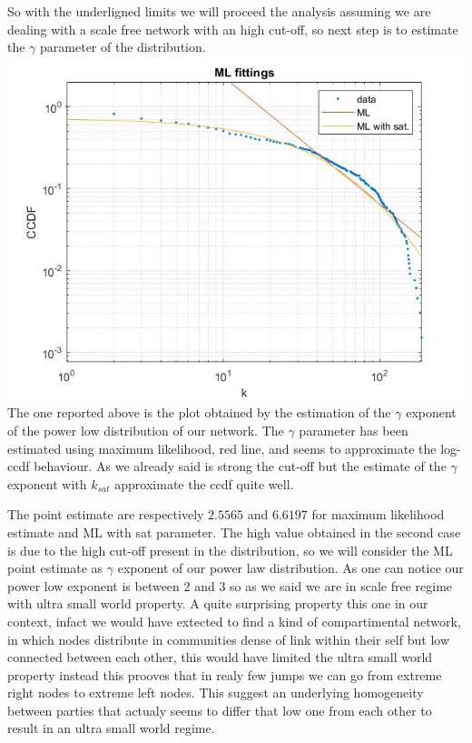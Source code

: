 \documentclass{article}%
\begin{document}
So with the underligned limits we will proceed the analysis assuming we are dealing with a scale free network with an high cut-off, so next step is to estimate the $\gamma$ parameter of the distribution.\\


\includegraphics[scale=0.5]{ML_fit}
\\

The one reported above is the plot obtained by the estimation of the $\gamma$ exponent of the power low distribution of our network. The $\gamma$ parameter has been estimated using maximum likelihood, red line, and seems to approximate the log-ccdf behaviour. As we already said is strong the cut-off but the estimate of the $\gamma$ exponent with $k_{sat}$ approximate the ccdf quite well. 

The point estimate are respectively $2.5565$ and $6.6197$ for maximum likelihood estimate and ML with sat parameter. The high value obtained in the second case is due to the high cut-off present in the distribution, so we will consider the ML point estimate as $\gamma$ exponent of our power law distribution. 
As one can notice our power low exponent is between 2 and 3 so as we said we are in scale free regime with ultra small world property. A quite surprising property this one in our context, infact we would have extected to find a kind of compartimental network, in which nodes distribute in communities dense of link within their self but low connected between each other, this would have limited the ultra small world property instead this prooves that in realy few jumps we can go from extreme right nodes to extreme left nodes. This suggest an underlying homogeneity between parties that actualy seems to differ that low one from each other to result in an ultra small world regime.
\end{document}
